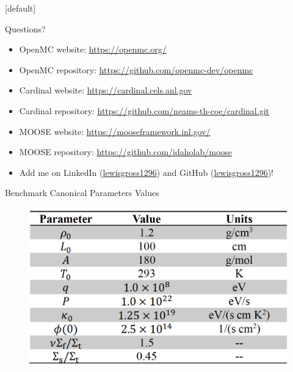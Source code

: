 \documentclass[9pt,t,aspectratio=169]{beamer}
\makeatletter
\newenvironment{withoutheadline}{
       \setbeamertemplate{headline}[default]
       \def\beamer@entrycode{\vspace*{-\headheight}}
    }{}
\makeatother
\begin{document}
\begin{withoutheadline}
    \begin{frame}{Questions?}
        \begin{itemize}
            \item OpenMC website: \href{https://openmc.org/}{https://openmc.org/}
            \item OpenMC repository: \href{https://github.com/openmc-dev/openmc}{https://github.com/openmc-dev/openmc}
            \item Cardinal website: \href{https://cardinal.cels.anl.gov}{https://cardinal.cels.anl.gov}
            \item Cardinal repository: \href{https://github.com/neams-th-coe/cardinal.git}{https://github.com/neams-th-coe/cardinal.git}
            \item MOOSE website: \href{https://mooseframework.inl.gov/}{https://mooseframework.inl.gov/}
            \item MOOSE repository: \href{https://github.com/idaholab/moose}{https://github.com/idaholab/moose}
            \item Add me on LinkedIn (\href{https://www.linkedin.com/in/lewisgross1296}{lewisgross1296}) and GitHub (\href{https://github.com/lewisgross1296}{lewisgross1296})!
        \end{itemize}
    \end{frame}
\end{withoutheadline}

\appendix

\begin{frame}{Benchmark Canonical Parameters Values}
    \vspace*{-0.4cm}
    \begin{figure}[T]
        \centering
        \includegraphics[width=0.75\linewidth]{figures/benchmark_values.png}
    \end{figure}
\end{frame}
\end{document}

